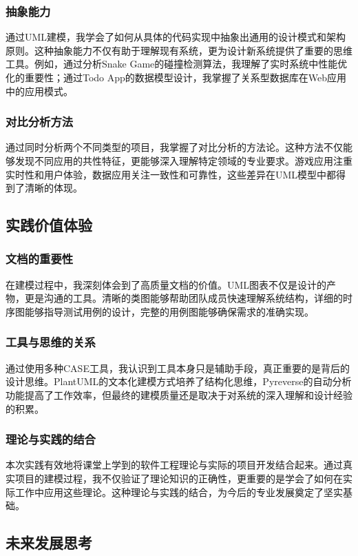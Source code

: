 \documentclass[a4paper]{article}
\begin{document}
\subsubsection{抽象能力}
通过UML建模，我学会了如何从具体的代码实现中抽象出通用的设计模式和架构原则。这种抽象能力不仅有助于理解现有系统，更为设计新系统提供了重要的思维工具。例如，通过分析Snake Game的碰撞检测算法，我理解了实时系统中性能优化的重要性；通过Todo App的数据模型设计，我掌握了关系型数据库在Web应用中的应用模式。

\subsubsection{对比分析方法}
通过同时分析两个不同类型的项目，我掌握了对比分析的方法论。这种方法不仅能够发现不同应用的共性特征，更能够深入理解特定领域的专业要求。游戏应用注重实时性和用户体验，数据应用关注一致性和可靠性，这些差异在UML模型中都得到了清晰的体现。

\subsection{实践价值体验}

\subsubsection{文档的重要性}
在建模过程中，我深刻体会到了高质量文档的价值。UML图表不仅是设计的产物，更是沟通的工具。清晰的类图能够帮助团队成员快速理解系统结构，详细的时序图能够指导测试用例的设计，完整的用例图能够确保需求的准确实现。

\subsubsection{工具与思维的关系}
通过使用多种CASE工具，我认识到工具本身只是辅助手段，真正重要的是背后的设计思维。PlantUML的文本化建模方式培养了结构化思维，Pyreverse的自动分析功能提高了工作效率，但最终的建模质量还是取决于对系统的深入理解和设计经验的积累。

\subsubsection{理论与实践的结合}
本次实践有效地将课堂上学到的软件工程理论与实际的项目开发结合起来。通过真实项目的建模过程，我不仅验证了理论知识的正确性，更重要的是学会了如何在实际工作中应用这些理论。这种理论与实践的结合，为今后的专业发展奠定了坚实基础。

\subsection{未来发展思考}
\end{document}

